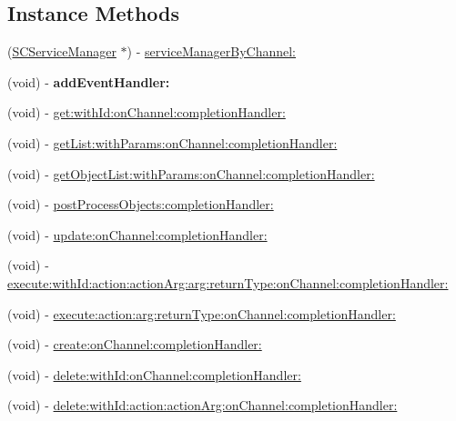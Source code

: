 \subsection*{Instance Methods}
\begin{DoxyCompactItemize}
\item 
(\hyperlink{interface_s_c_service_manager}{S\+C\+Service\+Manager} $\ast$) -\/ \hyperlink{interface_s_c_abstract_service_abacd77c4f0ca9ab525b83b6224aa26d3}{service\+Manager\+By\+Channel\+:}
\item 
(void) -\/ {\bfseries add\+Event\+Handler\+:}\hypertarget{interface_s_c_abstract_service_a132319e348f6bb052d263b8700428969}{}\label{interface_s_c_abstract_service_a132319e348f6bb052d263b8700428969}

\item 
(void) -\/ \hyperlink{interface_s_c_abstract_service_ac445d8d6aee8c01e7d58b431b0dd6f24}{get\+:with\+Id\+:on\+Channel\+:completion\+Handler\+:}
\item 
(void) -\/ \hyperlink{interface_s_c_abstract_service_ab353a5436b86810210702c316a62253d}{get\+List\+:with\+Params\+:on\+Channel\+:completion\+Handler\+:}
\item 
(void) -\/ \hyperlink{interface_s_c_abstract_service_adbc850a99d2a71cc90be83f55ed22ce3}{get\+Object\+List\+:with\+Params\+:on\+Channel\+:completion\+Handler\+:}
\item 
(void) -\/ \hyperlink{interface_s_c_abstract_service_a569e0dc4a0734d28a6750a9074315d36}{post\+Process\+Objects\+:completion\+Handler\+:}
\item 
(void) -\/ \hyperlink{interface_s_c_abstract_service_a150e20038a5ced6f3f8a3c8cb8c40007}{update\+:on\+Channel\+:completion\+Handler\+:}
\item 
(void) -\/ \hyperlink{interface_s_c_abstract_service_a25e154c6d50e8e88ee90b712ecbfb066}{execute\+:with\+Id\+:action\+:action\+Arg\+:arg\+:return\+Type\+:on\+Channel\+:completion\+Handler\+:}
\item 
(void) -\/ \hyperlink{interface_s_c_abstract_service_a5bc3b75a76f28461b4d2c4a1733d580a}{execute\+:action\+:arg\+:return\+Type\+:on\+Channel\+:completion\+Handler\+:}
\item 
(void) -\/ \hyperlink{interface_s_c_abstract_service_a9c3dd7e1c6d999d7d60e531a87c6c2f4}{create\+:on\+Channel\+:completion\+Handler\+:}
\item 
(void) -\/ \hyperlink{interface_s_c_abstract_service_ac0af977d373e4027ed1e1319e745de72}{delete\+:with\+Id\+:on\+Channel\+:completion\+Handler\+:}
\item 
(void) -\/ \hyperlink{interface_s_c_abstract_service_af8c7ee699e0321c8c4101a3421941ac8}{delete\+:with\+Id\+:action\+:action\+Arg\+:on\+Channel\+:completion\+Handler\+:}
\end{DoxyCompactItemize}
